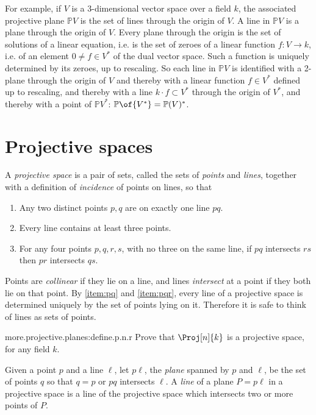 For example, if \(V\) is a 3-dimensional vector space over a field \(k\), the associated projective plane \(\mathbb{P}V\) is the set of lines through the origin of \(V\).
A line in \(\mathbb{P}V\) is a plane through the origin of \(V\).
Every plane through the origin is the set of solutions of a linear equation, i.e. is the set of zeroes of a linear function \(f \colon V \to k\), i.e. of an element \(0 \ne f \in V^*\) of the dual vector space.
Such a function is uniquely determined by its zeroes, up to rescaling.
So each line in \(\mathbb{P}V\) is identified with a 2-plane through the origin of \(V\) and thereby with a linear function \(f \in V^*\) defined up to rescaling, and thereby with a line \(k \cdot f \subset V^*\) through the origin of \(V^*\), and thereby with a point of \(\mathbb{P}V^*\): \(\mathbb{P}\of{V^*}=\mathbb{P}(V)^*\).

\section{Projective spaces}
A \emph{projective space} is a pair of sets, called the sets of \emph{points} and \emph{lines}, together with a definition of \emph{incidence} of points on lines, so that
\begin{enumerate}
  \item\label{item:pq} Any two distinct points \(p, q\) are on exactly one line \(pq\).
  \item\label{item:pqr} Every line contains at least three points.
  \item\label{item:pqrs} For any four points \(p, q, r, s\), with no three on the same line, if \(pq\) intersects \(rs\) then \(pr\) intersects \(qs\).
\end{enumerate}
Points are \emph{collinear} if they lie on a line, and lines \emph{intersect} at a point if they both lie on that point.
By \ref{item:pq} and \ref{item:pqr}, every line of a projective space is determined uniquely by the set of points lying on it.
Therefore it is safe to think of lines as sets of points.

\begin{problem}{more.projective.planes:define.p.n.r}
Prove that \(\Proj[n]{k}\) is a projective space, for any field \(k\).
\end{problem}



Given a point \(p\) and a line \(\ell\), let \(p\ell\), the \emph{plane} spanned by \(p\) and \(\ell\), be the set of points \(q\) so that \(q=p\) or \(pq\) intersects \(\ell\).
A \emph{line} of a plane \(P=p\ell\) in a projective space is a line of the projective space which intersects two or more points of \(P\).

